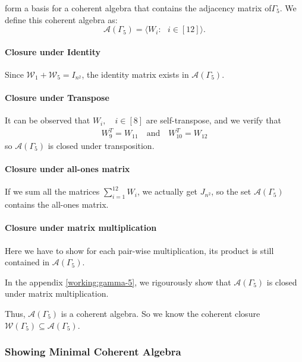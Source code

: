 form a basis for a coherent algebra that contains the adjacency matrix of$\Gamma_5$. We define this coherent algebra as:
\begin{equation*}
    \mathcal{A}(\Gamma_5) = \langle W_i: \text{ }i\in[12]\rangle.
\end{equation*}

\paragraph{Closure under Identity}
Since $\mathcal{W}_1 + \mathcal{W}_5 = I_{n^2}$, the identity matrix exists in $\mathcal{A}(\Gamma_5)$.

\paragraph{Closure under Transpose}
It can be observed that $W_i,\quad i\in[8]$ are self-transpose, and we verify that
\begin{align*}
    W_9^T = W_{11} \quad\text{and}\quad W_{10}^T = W_{12}
\end{align*}
so $\mathcal{A}(\Gamma_5)$ is closed under transposition.

\paragraph{Closure under all-ones matrix}
If we sum all the matrices $\sum_{i=1}^{12}W_i$, we actually get $J_{n^2}$, so the set $\mathcal{A}(\Gamma_5)$ contains the all-ones matrix.

\paragraph{Closure under matrix multiplication}

Here we have to show for each pair-wise multiplication, its product is still contained in $\mathcal{A}(\Gamma_5)$. 

In the appendix \ref{working:gamma-5}, we rigourously show that $\mathcal{A}(\Gamma_5)$ is closed under matrix multiplication.

Thus, $\mathcal{A}(\Gamma_5)$ is a coherent algebra. So we know the coherent closure $\mathcal{W}(\Gamma_5)\subseteq\mathcal{A}(\Gamma_5)$.

\subsubsection{Showing Minimal Coherent Algebra}

